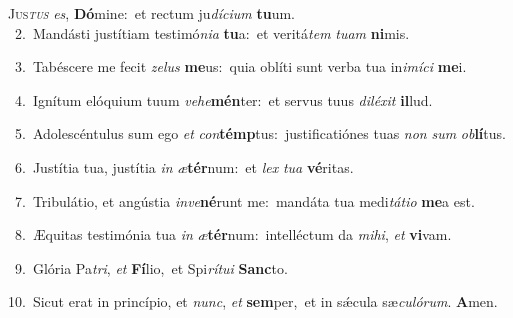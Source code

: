 \lettrine{\initial\textcolor{\initialcolor}{J}}{us\-\textit{tus}\-} \textit{es}\-, \textbf{Dó}\-mine:~\star et rectum ju\-\textit{dí}\-\textit{ci}\textit{um} \textbf{tu}\-um.\\
{\numbfont\textcolor{\numbcolor}{~2.}}~Mandásti justítiam testimó\-\textit{ni}\-\textit{a} \textbf{tu}\-a:~\star et veritá\textit{tem} \textit{tu}\-\textit{am} \textbf{ni}\-mis.\par
{\numbfont\textcolor{\numbcolor}{~3.}}~Tabéscere me fecit \textit{ze}\-\textit{lus} \textbf{me}\-us:~\star quia oblíti sunt verba tua in\-\textit{i}\-\textit{mí}\textit{ci} \textbf{me}\-i.\par
{\numbfont\textcolor{\numbcolor}{~4.}}~Ignítum elóquium tuum \textit{ve}\-\textit{he}\textbf{mén}ter:~\star et servus tuus \textit{di}\-\textit{lé}\textit{xit} \textbf{il}\-lud.\par
{\numbfont\textcolor{\numbcolor}{~5.}}~Adolescéntulus sum ego \textit{et} \textit{con}\-\textbf{témp}tus:~\star justificatiónes tuas \textit{non} \textit{sum} \textit{ob}\-\textbf{lí}tus.\par
{\numbfont\textcolor{\numbcolor}{~6.}}~Justítia tua, justítia \textit{in} \textit{æ}\-\textbf{tér}num:~\star et \textit{lex} \textit{tu}\-\textit{a} \textbf{vé}\-ritas.\par
{\numbfont\textcolor{\numbcolor}{~7.}}~Tribulátio, et angústia \textit{in}\-\textit{ve}\textbf{né}runt me:~\star mandáta tua medi\-\textit{tá}\-\textit{ti}\textit{o} \textbf{me}\-a est.\par
{\numbfont\textcolor{\numbcolor}{~8.}}~Æquitas testimónia tua \textit{in} \textit{æ}\-\textbf{tér}num:~\star intelléctum da \textit{mi}\-\textit{hi}, \textit{et} \textbf{vi}\-vam.\par
{\numbfont\textcolor{\numbcolor}{~9.}}~Glória Pa\-\textit{tri}\-, \textit{et} \textbf{Fí}\-lio,~\star et Spi\-\textit{rí}\-\textit{tu}\textit{i} \textbf{Sanc}\-to.\par
{\numbfont\textcolor{\numbcolor}{10.}}~Sicut erat in princípio, et \textit{nunc}\-, \textit{et} \textbf{sem}\-per,~\star et in sǽcula sæ\-\textit{cu}\-\textit{ló}\textit{rum}. \textbf{A}\-men.\par
